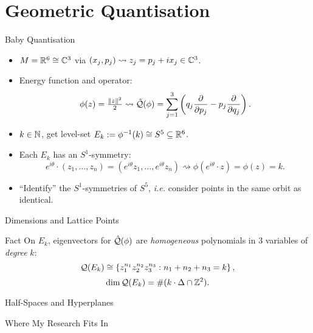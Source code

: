 \section{Geometric Quantisation}

\begin{frame}{Baby Quantisation}

    \begin{itemize}
        \item $M = \mathbb{R}^{6} \cong \mathbb{C}^{3}$ via $(x_{j}, p_{j}) \rightsquigarrow z_{j} = p_{j} + ix_{j} \in \mathbb{C}^{3}$.
        \item Energy function and operator:
        $$ \phi(z) = \tfrac{\|z\|^{2}}{2} \rightsquigarrow \hat{\mathcal{Q}}(\phi) = \sum_{j=1}^{3} \left( q_{j} \frac{\partial}{\partial p_{j}} - p_{j} \frac{\partial}{\partial q_{j}} \right). $$
        \item $k \in \mathbb{N}$, get level-set $E_{k} := \phi^{-1}(k) \cong S^{5} \subseteq \mathbb{R}^{6}$.
        \item Each $E_{k}$ has an $S^{1}$-symmetry:
        $$ e^{i\theta}\cdot (z_{1}, \ldots, z_{n}) = (e^{i\theta}z_{1}, \ldots, e^{i\theta}z_{n}) \rightsquigarrow \phi(e^{i\theta}\cdot z) = \phi(z) = k. $$
        \item ``Identify'' the $S^{1}$-symmetries of $S^{5}$, \emph{i.e.} consider points in the same orbit as identical.
    \end{itemize}

\end{frame}

\begin{frame}{Dimensions and Lattice Points}

    \begin{block}{Fact}
        On $E_{k}$, eigenvectors for $\hat{\mathcal{Q}}(\phi)$ are \emph{homogeneous} polynomials in $3$ variables of \emph{degree} $k$:
        $$ \mathcal{Q}(E_{k}) \cong \left\{ z_{1}^{n_{1}}z_{2}^{n_{2}}z_{3}^{n_{3}}  : n_{1} + n_{2} + n_{3} = k \right\}, $$
        $$ \dim\mathcal{Q}(E_{k}) = \#( k\cdot \Delta \cap \mathbb{Z}^{2} ). $$
    \end{block}

\end{frame}

\begin{frame}{Half-Spaces and Hyperplanes}


\end{frame}

\begin{frame}{Where My Research Fits In}


\end{frame}